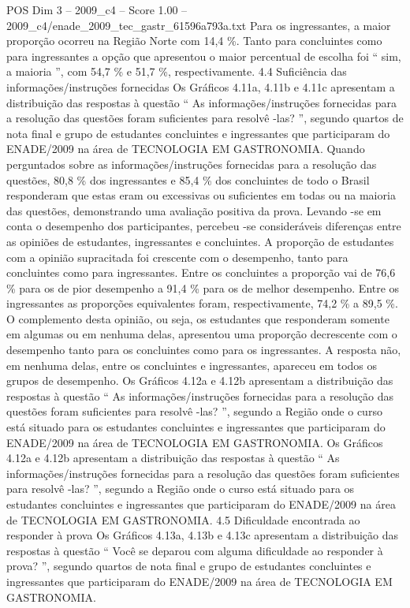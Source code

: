 \begin{textsample}{POS Dim 3 – 2009\_c4 – Score 1.00 – 2009\_c4/enade\_2009\_tec\_gastr\_61596a793a.txt}
Para os ingressantes, a maior proporção ocorreu na Região Norte com 14,4 \%.
Tanto para concluintes como para ingressantes a opção que apresentou o maior percentual de escolha foi “ sim, a maioria ”, com 54,7 \% e 51,7 \%, respectivamente. 4.4 Suficiência das informações/instruções fornecidas Os Gráficos 4.11a, 4.11b e 4.11c apresentam a distribuição das respostas à questão “ As informações/instruções fornecidas para a resolução das questões foram suficientes para resolvê -las? ”, segundo quartos de nota final e grupo de estudantes concluintes e ingressantes que participaram do ENADE/2009 na área de TECNOLOGIA EM GASTRONOMIA.
Quando perguntados sobre as informações/instruções fornecidas para a resolução das questões, 80,8 \% dos ingressantes e 85,4 \% dos concluintes de todo o Brasil responderam que estas eram ou excessivas ou suficientes em todas ou na maioria das questões, demonstrando uma avaliação positiva da prova.
Levando -se em conta o desempenho dos participantes, percebeu -se consideráveis diferenças entre as opiniões de estudantes, ingressantes e concluintes.
A proporção de estudantes com a opinião supracitada foi crescente com o desempenho, tanto para concluintes como para ingressantes.
Entre os concluintes a proporção vai de 76,6 \% para os de pior desempenho a 91,4 \% para os de melhor desempenho.
Entre os ingressantes as proporções equivalentes foram, respectivamente, 74,2 \% a 89,5 \%.
O complemento desta opinião, ou seja, os estudantes que responderam somente em algumas ou em nenhuma delas, apresentou uma proporção decrescente com o desempenho tanto para os concluintes como para os ingressantes.
A resposta não, em nenhuma delas, entre os concluintes e ingressantes, apareceu em todos os grupos de desempenho.
Os Gráficos 4.12a e 4.12b apresentam a distribuição das respostas à questão “ As informações/instruções fornecidas para a resolução das questões foram suficientes para resolvê -las? ”, segundo a Região onde o curso está situado para os estudantes concluintes e ingressantes que participaram do ENADE/2009 na área de TECNOLOGIA EM GASTRONOMIA.
Os Gráficos 4.12a e 4.12b apresentam a distribuição das respostas à questão “ As informações/instruções fornecidas para a resolução das questões foram suficientes para resolvê -las? ”, segundo a Região onde o curso está situado para os estudantes concluintes e ingressantes que participaram do ENADE/2009 na área de TECNOLOGIA EM GASTRONOMIA. 4.5 Dificuldade encontrada ao responder à prova Os Gráficos 4.13a, 4.13b e 4.13c apresentam a distribuição das respostas à questão “ Você se deparou com alguma dificuldade ao responder à prova? ”, segundo quartos de nota final e grupo de estudantes concluintes e ingressantes que participaram do ENADE/2009 na área de TECNOLOGIA EM GASTRONOMIA.

\end{textsample}
